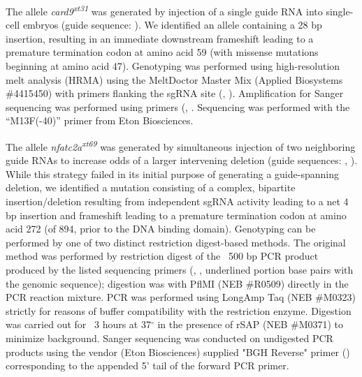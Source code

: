 The allele \textit{card9\textsuperscript{xt31}} was generated by injection of a single guide RNA into single-cell embryos (guide sequence: ). We identified an allele containing a 28 bp insertion, resulting in an immediate downstream frameshift leading to a premature termination codon at amino acid 59 (with missense mutations beginning at amino acid 47). Genotyping was performed using high-resolution melt analysis (HRMA) using the MeltDoctor Master Mix (Applied Biosystems \#4415450) with primers flanking the sgRNA site (, ). Amplification for Sanger sequencing was performed using primers (, . Sequencing was performed with the ``M13F(-40)'' primer from Eton Biosciences.

The allele \textit{nfatc2a\textsuperscript{xt69}} was generated by simultaneous injection of two neighboring guide RNAs to increase odds of a larger intervening deletion (guide sequences: , ). While this strategy failed in its initial purpose of generating a guide-spanning deletion, we identified a mutation consisting of a complex, bipartite insertion/deletion resulting from independent sgRNA activity leading to a net 4 bp insertion and frameshift leading to a premature termination codon at amino acid 272 (of 894, prior to the DNA binding domain). Genotyping can be performed by one of two distinct restriction digest-based methods. The original method was performed by restriction digest of the ~500 bp PCR product produced by the listed sequencing primers (, , underlined portion base pairs with the genomic sequence); digestion was with PflMI (NEB \#R0509) directly in the PCR reaction mixture. PCR was performed using LongAmp Taq (NEB \#M0323) strictly for reasons of buffer compatibility with the restriction enzyme. Digestion was carried out for ~3 hours at 37$^{\circ}$ in the presence of rSAP (NEB \#M0371) to minimize background. Sanger sequencing was conducted on undigested PCR products using the vendor (Eton Biosciences) supplied "BGH Reverse" primer () corresponding to the appended 5' tail of the forward PCR primer. 

